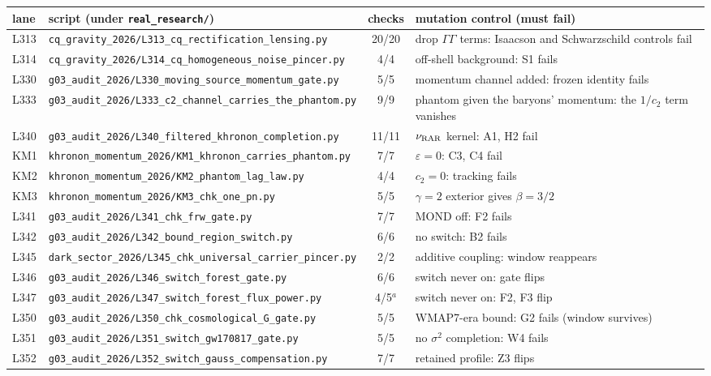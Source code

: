 \documentclass[10pt]{article}
\newcommand{\fpath}[1]{\nolinkurl{#1}}
\begin{document}
{\footnotesize
\begin{longtable}{@{}l>{\raggedright\arraybackslash}p{}c>{\raggedright\arraybackslash}p{}@{}}
\toprule
lane & script (under \texttt{real\_research/}) & checks & mutation control (must fail) \\
\midrule
\endhead
L313 & \fpath{cq_gravity_2026/L313_cq_rectification_lensing.py} & 20/20 & drop $\Gamma\Gamma$ terms: Isaacson and Schwarzschild controls fail \\
L314 & \fpath{cq_gravity_2026/L314_cq_homogeneous_noise_pincer.py} & 4/4 & off-shell background: S1 fails \\
L330 & \fpath{g03_audit_2026/L330_moving_source_momentum_gate.py} & 5/5 & momentum channel added: frozen identity fails \\
L333 & \fpath{g03_audit_2026/L333_c2_channel_carries_the_phantom.py} & 9/9 & phantom given the baryons' momentum: the $1/c_2$ term vanishes \\
L340 & \fpath{g03_audit_2026/L340_filtered_khronon_completion.py} & 11/11 & $\nu_{\rm RAR}$ kernel: A1, H2 fail \\
KM1 & \fpath{khronon_momentum_2026/KM1_khronon_carries_phantom.py} & 7/7 & $\varepsilon=0$: C3, C4 fail \\
KM2 & \fpath{khronon_momentum_2026/KM2_phantom_lag_law.py} & 4/4 & $c_2=0$: tracking fails \\
KM3 & \fpath{khronon_momentum_2026/KM3_chk_one_pn.py} & 5/5 & $\gamma=2$ exterior gives $\beta=3/2$ \\
L341 & \fpath{g03_audit_2026/L341_chk_frw_gate.py} & 7/7 & MOND off: F2 fails \\
L342 & \fpath{g03_audit_2026/L342_bound_region_switch.py} & 6/6 & no switch: B2 fails \\
L345 & \fpath{dark_sector_2026/L345_chk_universal_carrier_pincer.py} & 2/2 & additive coupling: window reappears \\
L346 & \fpath{g03_audit_2026/L346_switch_forest_gate.py} & 6/6 & switch never on: gate flips \\
L347 & \fpath{g03_audit_2026/L347_switch_forest_flux_power.py} & 4/5$^a$ & switch never on: F2, F3 flip \\
L350 & \fpath{g03_audit_2026/L350_chk_cosmological_G_gate.py} & 5/5 & WMAP7-era bound: G2 fails (window survives) \\
L351 & \fpath{g03_audit_2026/L351_switch_gw170817_gate.py} & 5/5 & no $\sigma^2$ completion: W4 fails \\
L352 & \fpath{g03_audit_2026/L352_switch_gauss_compensation.py} & 7/7 & retained profile: Z3 flips \\

\end{longtable}}
\end{document}
